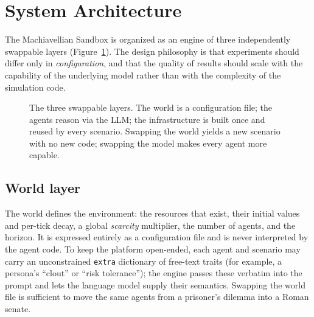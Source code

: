 \section{System Architecture}
\label{sec:architecture}

The Machiavellian Sandbox is organized as an engine of three independently swappable layers (Figure~\ref{fig:arch}). The design philosophy is that experiments should differ only in \emph{configuration}, and that the quality of results should scale with the capability of the underlying model rather than with the complexity of the simulation code.

\begin{figure}[t]
  \centering
  \caption{The three swappable layers. The world is a configuration file; the agents reason via the LLM; the infrastructure is built once and reused by every scenario. Swapping the world yields a new scenario with no new code; swapping the model makes every agent more capable.}
  \label{fig:arch}
\end{figure}

\subsection{World layer}
The world defines the environment: the resources that exist, their initial values and per-tick decay, a global \emph{scarcity} multiplier, the number of agents, and the horizon. It is expressed entirely as a configuration file and is never interpreted by the agent code. To keep the platform open-ended, each agent and scenario may carry an unconstrained \texttt{extra} dictionary of free-text traits (for example, a persona's ``clout'' or ``risk tolerance''); the engine passes these verbatim into the prompt and lets the language model supply their semantics. Swapping the world file is sufficient to move the same agents from a prisoner's dilemma into a Roman senate.

